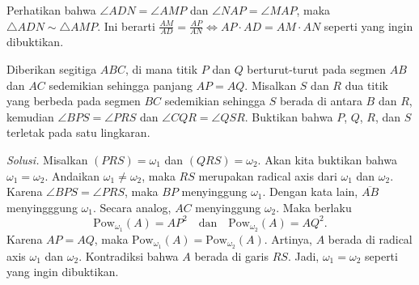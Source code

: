 \documentclass[12pt]{scrartcl}
\begin{document}
Perhatikan bahwa $\angle ADN=\angle AMP$ dan $\angle NAP=\angle MAP$, maka $\triangle ADN\sim \triangle AMP$. Ini berarti $\frac{AM}{AD} = \frac{AP}{AN}\iff AP\cdot AD=AM\cdot AN$ seperti yang ingin dibuktikan.
\begin{center}
\end{center}
\newpage
\begin{tcolorbox}[title=\textbf{Soal 6: USAJMO 2012/1}]
Diberikan segitiga $ABC$, di mana titik $P$ dan $Q$ berturut-turut pada segmen $AB$ dan $AC$ sedemikian sehingga panjang $AP=AQ$. Misalkan $S$ dan $R$ dua titik yang berbeda pada segmen $BC$ sedemikian sehingga $S$ berada di antara $B$ dan $R$, kemudian $\angle BPS=\angle PRS$ dan $\angle CQR=\angle QSR$. Buktikan bahwa $P$, $Q$, $R$, dan $S$ terletak pada satu lingkaran.
\end{tcolorbox}
\noindent\textit{Solusi.} Misalkan $(PRS)=\omega_1$ dan $(QRS)=\omega_2$. Akan kita buktikan bahwa $\omega_1=\omega_2$. Andaikan $\omega_1\neq \omega_2$, maka $RS$ merupakan radical axis dari $\omega_1$ dan $\omega_2$. Karena $\angle BPS=\angle PRS$, maka $BP$ menyinggung $\omega_1$. Dengan kata lain, $\overline{AB}$ menyingggung $\omega_1$. Secara analog, $AC$ menyinggung $\omega_2$. Maka berlaku
\[\text{Pow}_{\omega_1}(A)= AP^2\quad \text{dan}\quad \text{Pow}_{\omega_2}(A)= AQ^2.\]
Karena $AP=AQ$, maka $\text{Pow}_{\omega_1}(A)=\text{Pow}_{\omega_2}(A)$. Artinya, $A$ berada di radical axis $\omega_1$ dan $\omega_2$. Kontradiksi bahwa $A$ berada di garis $RS$. Jadi, $\omega_1=\omega_2$ seperti yang ingin dibuktikan.
\end{document}
